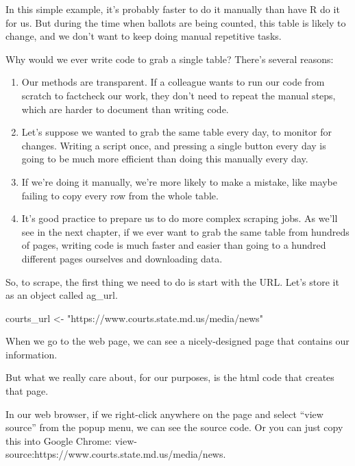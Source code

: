 \documentclass[
  letterpaper,
  DIV=11,
  numbers=noendperiod]{scrreprt}
\newenvironment{Shaded}{\begin{snugshade}}{\end{snugshade}}
\newcommand{\NormalTok}[1]{\textcolor[rgb]{0.00,0.23,0.31}{#1}}
\newcommand{\OtherTok}[1]{\textcolor[rgb]{0.00,0.23,0.31}{#1}}
\newcommand{\StringTok}[1]{\textcolor[rgb]{0.13,0.47,0.30}{#1}}
\providecommand{\tightlist}{%
  \setlength{\itemsep}{0pt}\setlength{\parskip}{0pt}}\usepackage{longtable,booktabs,array}
\begin{document}
In this simple example, it's probably faster to do it manually than have
R do it for us. But during the time when ballots are being counted, this
table is likely to change, and we don't want to keep doing manual
repetitive tasks.

Why would we ever write code to grab a single table? There's several
reasons:

\begin{enumerate}
\def\labelenumi{\arabic{enumi}.}
\tightlist
\item
  Our methods are transparent. If a colleague wants to run our code from
  scratch to factcheck our work, they don't need to repeat the manual
  steps, which are harder to document than writing code.
\item
  Let's suppose we wanted to grab the same table every day, to monitor
  for changes. Writing a script once, and pressing a single button every
  day is going to be much more efficient than doing this manually every
  day.
\item
  If we're doing it manually, we're more likely to make a mistake, like
  maybe failing to copy every row from the whole table.
\item
  It's good practice to prepare us to do more complex scraping jobs. As
  we'll see in the next chapter, if we ever want to grab the same table
  from hundreds of pages, writing code is much faster and easier than
  going to a hundred different pages ourselves and downloading data.
\end{enumerate}

So, to scrape, the first thing we need to do is start with the URL.
Let's store it as an object called ag\_url.

\begin{Shaded}
\begin{Highlighting}[]
\NormalTok{courts\_url }\OtherTok{\textless{}{-}} \StringTok{"https://www.courts.state.md.us/media/news"}
\end{Highlighting}
\end{Shaded}

When we go to the web page, we can see a nicely-designed page that
contains our information.

But what we really care about, for our purposes, is the html code that
creates that page.

In our web browser, if we right-click anywhere on the page and select
``view source'' from the popup menu, we can see the source code. Or you
can just copy this into Google Chrome:
view-source:https://www.courts.state.md.us/media/news.
\end{document}
